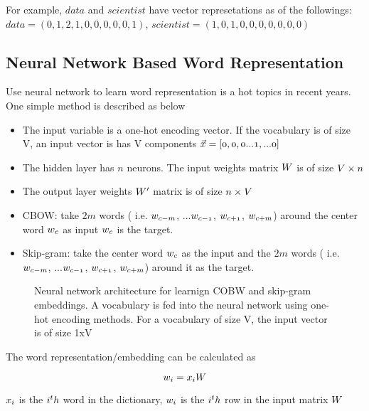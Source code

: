 \documentclass[12pt, oneside]{article}
\begin{document}
For example, $data$ and $scientist$ have vector represetations as of the followings: $data=(0, 1, 2, 1, 0, 0, 0, 0, 0, 1)$, $scientist=(1, 0, 1, 0, 0, 0, 0, 0, 0, 0)$


\subsection{Neural Network Based Word Representation}

Use neural network to learn word representation is a hot topics in recent years. One simple method is described as below

\begin{itemize}

\item The input variable is a one-hot encoding vector. If the vocabulary is of size V, an input vector is has V components $\mathnormal{\vec{x}=[0, 0, 0 ...1, ...0]}$ 
\item The hidden layer has $n$ neurons. The input weights matrix $\mathnormal{W}$ is of size $\mathnormal{V\times n}$
\item The output layer weights $\mathnormal{W}'$ matrix is of size $\mathnormal{n\times V}$
\item CBOW: take $2m$ words ( i.e. $\mathnormal{w_{c-m}}$, ...$\mathnormal{w_{c-1}}$, $\mathnormal{w_{c+1}}$, $\mathnormal{w_{c+m}}$) around the center word $\mathnormal{w_c}$ as input  $\mathnormal{w_c}$ is the target.
\item Skip-gram: take the center word $\mathnormal{w_c}$ as the input and the $2m$ words ( i.e. $\mathnormal{w_{c-m}}$, ...$\mathnormal{w_{c-1}}$, $\mathnormal{w_{c+1}}$, $\mathnormal{w_{c+m}}$) around it as the target.

\end{itemize}


\begin{center}
\begin{figure}

\caption{Neural network architecture for learnign COBW and skip-gram embeddings. A vocabulary is fed into the neural network using one-hot encoding methods. For a vocabulary of size V, the input vector is of size 1xV
 }
\end{figure}
\end{center}

The word representation/embedding can be calculated as 

$$\mathnormal{w_i=x_iW}$$

$\mathnormal{x_i}$ is the $\mathnormal{i^th}$ word in the dictionary, $\mathnormal{w_i}$ is the $\mathnormal{i^th}$ row in the input matrix $\mathnormal{W}$
\end{document}
